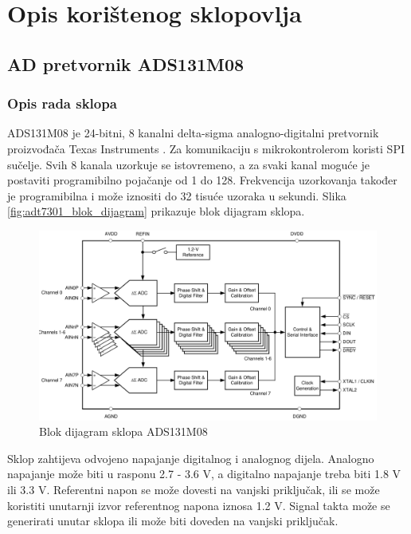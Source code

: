 \chapter{Opis korištenog sklopovlja}
    \section{AD pretvornik ADS131M08}

        \subsection{Opis rada sklopa}
            ADS131M08 je 24-bitni, 8 kanalni delta-sigma analogno-digitalni pretvornik  proizvođača Texas Instruments \cite{ads131m08_datasheet}. Za komunikaciju s mikrokontrolerom koristi SPI sučelje. Svih 8 kanala uzorkuje se istovremeno, a za svaki kanal moguće je postaviti programibilno pojačanje od 1 do 128. Frekvencija uzorkovanja također je programibilna i može iznositi do 32 tisuće uzoraka u sekundi. Slika \ref{fig:adt7301_blok_dijagram} prikazuje blok dijagram sklopa.

            \begin{figure}[htb]
                \centering
                \includegraphics[width=\textwidth]{slike/ads131m08_blok_dijagram.png}
                \caption{Blok dijagram sklopa ADS131M08 \cite{ads131m08_datasheet}}
                \label{fig:ads131m08_blok_dijagram}
            \end{figure}

            Sklop zahtijeva odvojeno napajanje digitalnog i analognog dijela. Analogno napajanje može biti u rasponu 2.7 - 3.6 V, a digitalno napajanje treba biti 1.8 V ili 3.3 V. Referentni napon se može dovesti na vanjski priključak, ili se može koristiti unutarnji izvor referentnog napona iznosa 1.2 V. Signal takta može se generirati unutar sklopa ili može biti doveden na vanjski priključak. 

